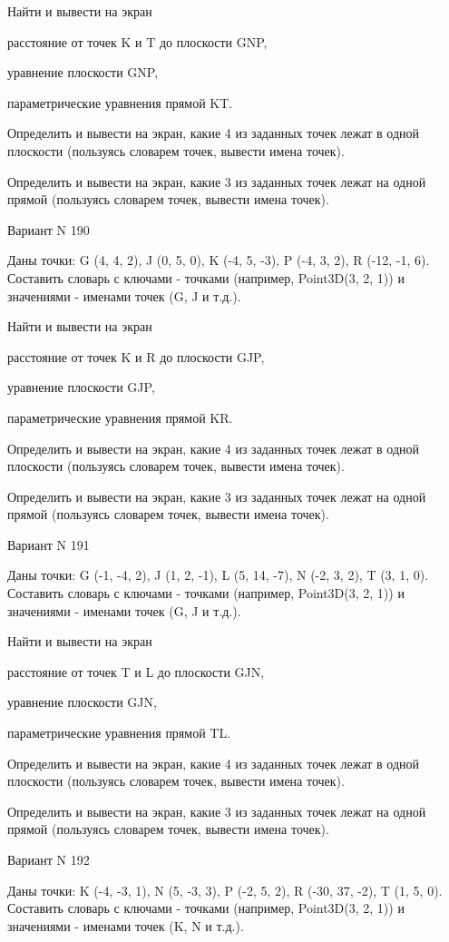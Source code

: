 \documentclass[11pt]{report}
\begin{document}
Найти и вывести на экран


расстояние от точек K и T до плоскости GNP,


уравнение плоскости GNP,


параметрические уравнения прямой KT.


Определить и вывести на экран, какие 4 из заданных точек лежат в одной плоскости (пользуясь словарем точек, вывести имена точек).


Определить и вывести на экран, какие 3 из заданных точек лежат на одной прямой (пользуясь словарем точек, вывести имена точек).

\newpage
Вариант N 190

Даны точки: G (4, 4, 2), J (0, 5, 0), K (-4, 5, -3), P (-4, 3, 2), R (-12, -1, 6).
Составить словарь с ключами - точками (например, Point3D(3, 2, 1)) и значениями - именами точек (G, J и т.д.).


Найти и вывести на экран


расстояние от точек K и R до плоскости GJP,


уравнение плоскости GJP,


параметрические уравнения прямой KR.


Определить и вывести на экран, какие 4 из заданных точек лежат в одной плоскости (пользуясь словарем точек, вывести имена точек).


Определить и вывести на экран, какие 3 из заданных точек лежат на одной прямой (пользуясь словарем точек, вывести имена точек).

\newpage
Вариант N 191

Даны точки: G (-1, -4, 2), J (1, 2, -1), L (5, 14, -7), N (-2, 3, 2), T (3, 1, 0).
Составить словарь с ключами - точками (например, Point3D(3, 2, 1)) и значениями - именами точек (G, J и т.д.).


Найти и вывести на экран


расстояние от точек T и L до плоскости GJN,


уравнение плоскости GJN,


параметрические уравнения прямой TL.


Определить и вывести на экран, какие 4 из заданных точек лежат в одной плоскости (пользуясь словарем точек, вывести имена точек).


Определить и вывести на экран, какие 3 из заданных точек лежат на одной прямой (пользуясь словарем точек, вывести имена точек).

\newpage
Вариант N 192

Даны точки: K (-4, -3, 1), N (5, -3, 3), P (-2, 5, 2), R (-30, 37, -2), T (1, 5, 0).
Составить словарь с ключами - точками (например, Point3D(3, 2, 1)) и значениями - именами точек (K, N и т.д.).
\end{document}
